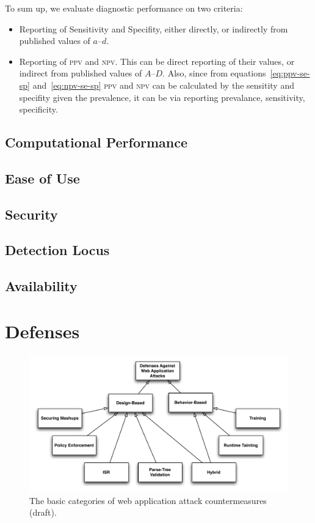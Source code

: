 \documentclass[conference]{IEEEtran}
\begin{document}
To sum up, we evaluate diagnostic performance on two criteria:

\begin{itemize}
\item Reporting of Sensitivity and Specifity, either directly, or
  indirectly from published values of $a$--$d$.
\item Reporting of \textsc{ppv} and \textsc{npv}. This can be direct
  reporting of their values, or indirect from published values of
  $A$--$D$. Also, since from equations~\ref{eq:ppv-se-sp}
  and~\ref{eq:npv-se-sp} \textsc{ppv} and \textsc{npv} can be
  calculated by the sensitity and specifity given the prevalence, it
  can be via reporting prevalance, sensitivity, specificity.
\end{itemize}
 
\subsection{Computational Performance}

\subsection{Ease of Use}

\subsection{Security}

\subsection{Detection Locus}

\subsection{Availability}

\section{Defenses}
\label{sec:defs}

\begin{figure} [ht]
\begin{center}
\leavevmode
\includegraphics[scale=0.62]{defenses.pdf}
\end{center}
\caption{\label{fig:defenses}The basic categories of web application
attack countermeasures ({\sc draft}).}
\end{figure}
\end{document}
